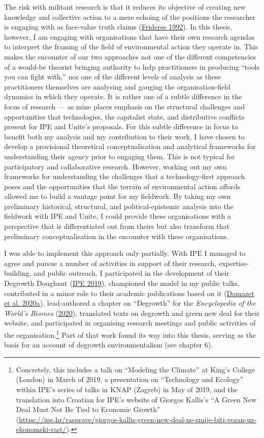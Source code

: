 \documentclass[a4paper, nobind]{templates/ociamthesis}
\begin{document}
The risk with militant research is that it reduces its objective of creating new knowledge and collective action to a mere echoing of the positions the researcher is engaging with as face-value truth claims (\protect\hyperlink{ref-frideres_participatory_1992}{Frideres 1992}). In this thesis, however, I am engaging with organisations that have their own research agendas to interpret the framing of the field of environmental action they operate in. This makes the encounter of our two approaches not one of the different competencies of a would-be theorist bringing authority to help practitioners in producing ``tools you can fight with,'' nor one of the different levels of analysis as these practitioners themselves are analysing and gauging the organisation-field dynamics in which they operate. It is rather one of a subtle difference in the focus of research --- as mine places emphasis on the structural challenges and opportunities that technologies, the capitalist state, and distributive conflicts present for IPE and Unite's proposals. For this subtle difference in focus to benefit both my analysis and my contribution to their work, I have chosen to develop a provisional theoretical conceptualisation and analytical frameworks for understanding their agency prior to engaging them. This is not typical for participatory and collaborative research. However, working out my own frameworks for understanding the challenges that a technology-first approach poses and the opportunities that the terrain of environmental action affords allowed me to build a vantage point for my fieldwork. By taking my own preliminary historical, structural, and political-epistemic analysis into the fieldwork with IPE and Unite, I could provide these organisations with a perspective that is differentiated out from theirs but also transform that preliminary conceptualisation in the encounter with these organisations.

I was able to implement this approach only partially. With IPE I managed to agree and pursue a number of activities in support of their research, expertise-building, and public outreach. I participated in the development of their Degrowth Doughnut (\protect\hyperlink{ref-ipe_degrowth_2019}{IPE 2019}), championed the model in my public talks, contributed in a minor role to their academic publications based on it (\protect\hyperlink{ref-domazet_degrowth_2020}{Domazet et al. 2020a}), lead-authored a chapter on ``Degrowth'' for the \emph{Encyclopedia of the World's Biomes} (\protect\hyperlink{ref-medak_degrowth_2020}{2020}), translated texts on degrowth and green new deal for their website, and participated in organising research meetings and public activities of the organisation.\footnote{Concretely, this includes a talk on ``Modeling the Climate'' at King's College (London) in March of 2019, a presentation on ``Technology and Ecology'' within IPE's series of talks in KNAP (Zagreb) in May of 2019, and the translation into Croatian for IPE's website of Giorgos Kallis's ``A Green New Deal Must Not Be Tied to Economic Growth'' (\url{https://ipe.hr/rasprave/giorgos-kallis-green-new-deal-ne-smije-biti-vezan-uz-ekonomski-rast/}).} Part of that work found its way into this thesis, serving as the basis for an account of degrowth environmentalism (see chapter 6).
\end{document}
